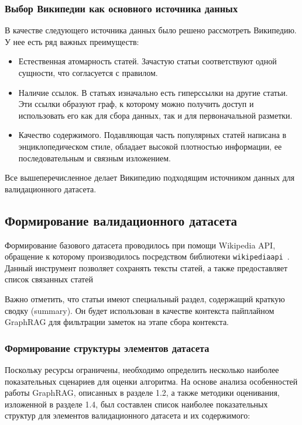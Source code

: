 \subsubsection*{Выбор Википедии как основного источника данных}
В качестве следующего источника данных было решено рассмотреть Википедию.
У нее есть ряд важных преимуществ:
\begin{itemize}
      \item Естественная атомарность статей. Зачастую статьи соответствуют одной сущности,
            что согласуется с правилом.
      \item Наличие ссылок. В статьях изначально есть гиперссылки на другие статьи.
            Эти ссылки образуют граф,
            к которому можно получить доступ и использовать его как для сбора данных,
            так и для первоначальной разметки.
      \item Качество содержимого. Подавляющая часть популярных статей
            написана в энциклопедическом стиле,
            обладает высокой плотностью информации, ее последовательным и связным изложением.
\end{itemize}

Все вышеперечисленное делает Википедию
подходящим источником данных для валидационного датасета.

\subsection{Формирование валидационного датасета}

Формирование базового датасета проводилось при помощи Wikipedia API,
обращение к которому производилось посредством библиотеки
\texttt{wikipediaapi}~\cite{wikipediaapi}.
Данный инструмент позволяет сохранять тексты статей,
а также предоставляет
список связанных статей

Важно отметить, что статьи имеют специальный раздел, содержащий краткую сводку (summary).
Он будет использован в качестве контекста пайплайном GraphRAG
для фильтрации заметок на этапе сбора контекста.

\subsubsection*{Формирование структуры элементов датасета}
Поскольку ресурсы ограничены,
необходимо определить несколько наиболее показательных сценариев для оценки алгоритма.
На основе анализа особенностей работы GraphRAG, описанных в разделе 1.2,
а также методики оценивания, изложенной в разделе 1.4,
был составлен список наиболее показательных структур для
элементов валидационного датасета
и их содержимого:

